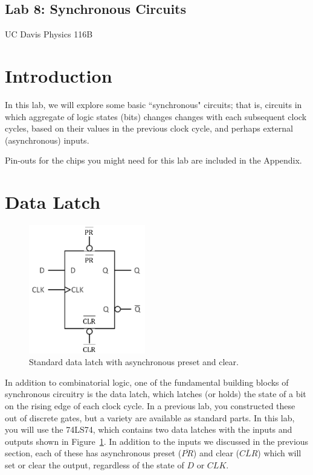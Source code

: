 \documentclass[12pt]{article}
\begin{document}




\begin{center}
\section*{Lab 8: Synchronous Circuits}
UC Davis Physics 116B\\
\end{center}

\section*{Introduction}



In this lab, we will explore some basic ``synchronous" circuits; that is, circuits in which aggregate of logic states (bits) changes
changes with each subsequent clock cycles, based on their values in the previous clock cycle, and perhaps external (asynchronous)
inputs.

Pin-outs for the chips you might need for this lab are included in the Appendix.


\section *{Data Latch}

\begin{figure}[!h]
\centerline{\includegraphics[width=2in]{figs/d-latch-7474.pdf}}
\caption{Standard data latch with asynchronous preset and clear.}
\label{fig:d-latch-7474}
\end{figure}


In addition to combinatorial logic, one of the fundamental building blocks of synchronous circuitry is the
data latch, which latches (or holds) the state of a bit on the rising edge of each clock cycle.
In a previous lab, you constructed these out of discrete gates, but a variety are available
as standard parts.  In this lab, you will use the 74LS74, which contains two data latches with the 
inputs and outputs shown in Figure~\ref{fig:d-latch-7474}.  In addition to the inputs we discussed in the previous section,
each of these has  asynchronous preset ($\overline{PR}$) and clear ($\overline{CLR}$) which will set or clear the output, regardless of the state of $D$ or $CLK$.
\end{document}
